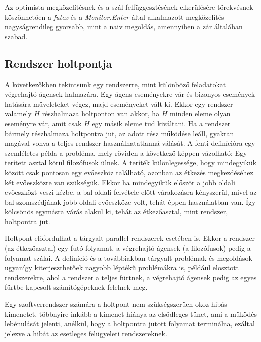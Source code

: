     Az optimista megközelítésnek és a szál felfüggesztésének elkerülésére törekvésnek köszönhetően a \emph{futex} és a \emph{Monitor.Enter} által alkalmazott megközelítés nagyságrendileg gyorsabb, mint a naiv megoldás, amennyiben a zár általában szabad.
    
    \vfill
        
    \subsection{Rendszer holtpontja} 
      
    A következőkben tekintsünk egy rendszerre, mint különböző feladatokat végrehajtó ágensek halmazára. Egy ágens eseményekre vár és bizonyos események hatására műveleteket végez, majd eseményeket vált ki. Ekkor egy rendszer valamely $H$ részhalmaza holtponton van akkor, ha $H$ minden eleme olyan eseményre vár, amit csak $H$ egy másik eleme tud kiváltani. Ha a rendszer bármely részhalmaza holtpontra jut, az adott rész működése leáll, gyakran magával vonva a teljes rendszer használhatatlanná válását. A fenti definícióra egy szemléletes példa a \cite{DiningPhilosophers} probléma, mely röviden a következő képpen vázolható: Egy terített asztal körül filozófusok ülnek. A teríték különlegessége, hogy mindegyikük között csak pontosan egy evőeszköz található, azonban az étkezés megkezdéséhez két evőeszközre van szükségük. Ekkor ha mindegyikük először a jobb oldali evőeszközt veszi kézbe, a bal oldali felvétele előtt várakozásra kényszerül, mivel az bal szomszédjának jobb oldali evőeszköze volt, tehát éppen használatban van. Így kölcsönös egymásra várás alakul ki, tehát az étkezőasztal, mint rendszer, holtpontra jut.
    
    Holtpont előfordulhat a tárgyalt parallel rendszerek esetében is. Ekkor a rendszer (az étkezőasztal) egy futó folyamat, a végrehajtó ágensek (a filozófusok) pedig a folyamat szálai. A definíció és a továbbiakban tárgyalt problémak és megoldások ugyanígy kiterjeszthetőek nagyobb léptékű problémákra is, például elosztott rendszerekre, ahol a rendszer a teljes fürtnek, a végrehajtó ágensek pedig az egyes fürtbe kapcsolt számítógépeknek felelnek meg.
    
    Egy szoftverrendszer számára a holtpont nem szükségszerűen okoz hibás kimenetet, többnyire inkább a kimenet hiánya az elsődleges tünet, ami a működés lebénulását jelenti, anélkül, hogy a holtpontra jutott folyamat terminálna, ezáltal jelezve a hibát az esetleges felügyeleti rendszereknek.
    
